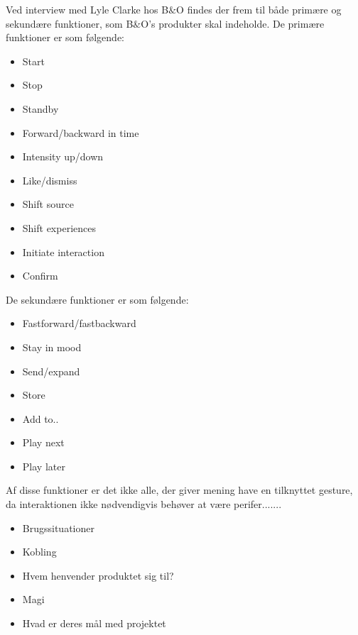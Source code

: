 Ved interview med Lyle Clarke hos B$\&$O findes der frem til både primære og sekundære funktioner, som B$\&$O's produkter skal indeholde. De primære funktioner er som følgende:

\begin{itemize}
	\item Start
	\item Stop
	\item Standby
	\item Forward/backward in time
	\item Intensity up/down
	\item Like/dismiss
	\item Shift source
	\item Shift experiences
	\item Initiate interaction
	\item Confirm
\end{itemize}

De sekundære funktioner er som følgende:

\begin{itemize}
	\item Fastforward/fastbackward
	\item Stay in mood
	\item Send/expand
	\item Store
	\item Add to..
	\item Play next
	\item Play later
\end{itemize}

Af disse funktioner er det ikke alle, der giver mening have en tilknyttet gesture, da interaktionen ikke nødvendigvis behøver at være perifer.......

\begin{itemize}
  \item Brugssituationer 
  \item Kobling
  \item Hvem henvender produktet sig til?
  \item Magi
  \item Hvad er deres mål med projektet
\end{itemize}

